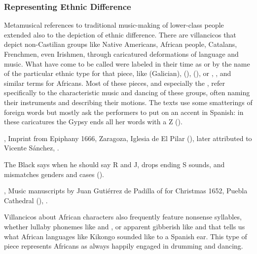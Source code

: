 \subsubsection{Representing Ethnic Difference}

Metamusical references to traditional music-making of lower-class people
extended also to the depiction of ethnic difference.
There are villancicos that depict non-Castilian groups like Native Americans,
African people, Catalans, Frenchmen, even Irishmen, through caricatured
deformations of language and music.
What have come to be called  were labeled in their
time as  or by the name of the particular ethnic
type for that piece, like  (Galician), 
(),  (), or ,
, and similar terms for Africans.
Most of these pieces, and especially the , refer
specifically to the characteristic music and dancing of these groups, often
naming their instruments and describing their motions.
The texts use some smatterings of foreign words but mostly ask the performers
to put on an accent in Spanish: in these caricatures the Gypsy ends all her
words with a Z ().
\begin{Footnote}
    , Imprint from Epiphany 1666, Zaragoza,
    Iglesia de El Pilar (), later attributed to Vicente
    Sánchez, .
\end{Footnote}
The Black says when he should say R and J, drops ending S sounds, and
mismatches genders and cases ().%
\begin{Footnote}
    , Music manuscripts by Juan Gutiérrez de
    Padilla of  for Christmas 1652, Puebla Cathedral
    (), \XXX[WLSCM32].
\end{Footnote}
Villancicos about African characters also frequently feature nonsense
syllables, whether lullaby phonemes like  and , or apparent gibberish like  and
 that tells us what African languages like Kikongo
sounded like to a Spanish ear.%
This type of piece represents Africans as always happily engaged in drumming
and dancing.%

